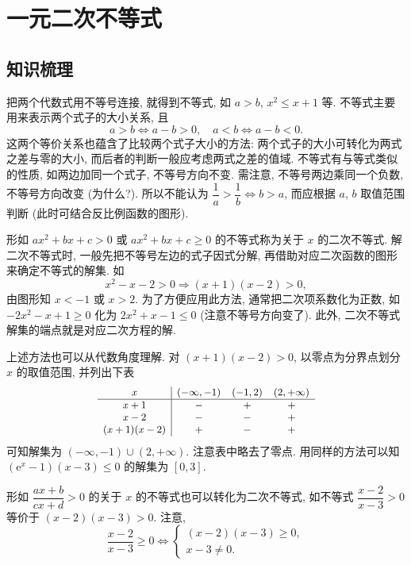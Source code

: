 
\section{一元二次不等式}

\subsection{知识梳理}

把两个代数式用不等号连接, 就得到不等式, 如 $a>b$, $x^2\leqslant x+1$ 等. 不等式主要用来表示两个式子的大小关系, 且
\[a>b\Leftrightarrow a-b>0,\quad a<b\Leftrightarrow a-b<0.\]
这两个等价关系也蕴含了比较两个式子大小的方法: 两个式子的大小可转化为两式之差与零的大小, 而后者的判断一般应考虑两式之差的值域. 不等式有与等式类似的性质, 如两边加同一个式子, 不等号方向不变. 需注意, 不等号两边乘同一个负数, 不等号方向改变 (为什么?). 所以不能认为 $\dfrac1a>\dfrac1b \Leftrightarrow b>a$, 而应根据 $a$, $b$ 取值范围判断 (此时可结合反比例函数的图形).

形如 $ax^2+bx+c>0$ 或 $ax^2+bx+c\geqslant0$ 的不等式称为关于 $x$ 的二次不等式. 解二次不等式时, 一般先把不等号左边的式子因式分解, 再借助对应二次函数的图形来确定不等式的解集. 如 
\[x^2-x-2>0\Rightarrow (x+1)(x-2)>0,\]
由图形知 $x<-1$ 或 $x>2$. 为了方便应用此方法, 通常把二次项系数化为正数, 如 $-2x^2-x+1\geqslant 0$ 化为 $2x^2+x-1\leqslant 0$ (注意不等号方向变了). 此外, 二次不等式解集的端点就是对应二次方程的解.

上述方法也可以从代数角度理解. 对 $(x+1)(x-2)>0$, 以零点为分界点划分 $x$ 的取值范围, 并列出下表
\[\small\begin{array}{c|ccc}
    x & (-\infty,-1) & (-1,2) & (2,+\infty) \\
    \hline
    x+1 & - & + & + \\
    x-2 & - & - & + \\
    (x+1)(x-2) & + & - & +
\end{array}\]
可知解集为 $(-\infty,-1)\cup(2,+\infty)$. 注意表中略去了零点. 用同样的方法可以知 $(\mathrm{e}^x-1)(x-3)\leqslant 0$ 的解集为 $[0,3]$.

形如 $\dfrac{ax+b}{cx+d}>0$ 的关于 $x$ 的不等式也可以转化为二次不等式, 如不等式 $\dfrac{x-2}{x-3}>0$ 等价于 $(x-2)(x-3)>0$. 注意,
\[\frac{x-2}{x-3}\geqslant 0\Leftrightarrow \left\{\!\!\begin{array}{l}
    (x-2)(x-3)\geqslant 0,  \\
    x-3\neq 0.
\end{array}\right.\]


